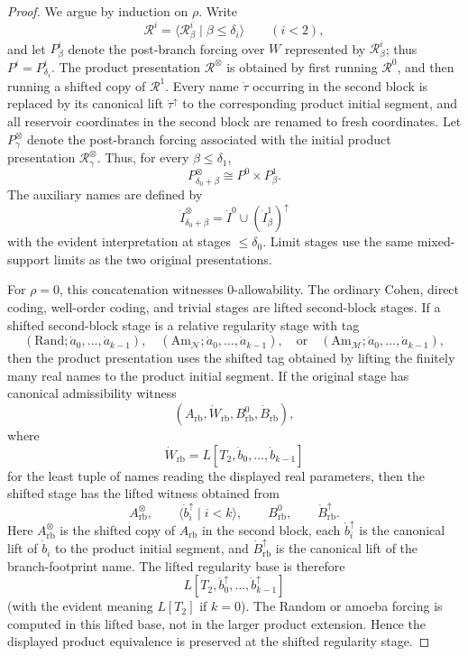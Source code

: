 \documentclass[10pt,a4paper]{amsart}
\begin{document}
\begin{proof}
We argue by induction on \(\rho\).  Write
\[
   \mathcal R^i=\langle \mathcal R^i_\beta\mid \beta\leq\delta_i\rangle
   \qquad (i<2),
\]
and let \(P^i_\beta\) denote the post-branch forcing over \(W\) represented by
\(\mathcal R^i_\beta\); thus \(P^i=P^i_{\delta_i}\).  The product presentation
\(\mathcal R^\otimes\) is obtained by first running \(\mathcal R^0\), and then
running a shifted copy of \(\mathcal R^1\).  Every name \(\dot\tau\) occurring in the second block is
replaced by its canonical lift \(\dot\tau^\uparrow\) to the corresponding
product initial segment, and all reservoir coordinates in the second block are
renamed to fresh coordinates.  Let \(P^\otimes_\gamma\) denote the post-branch forcing associated with the
initial product presentation \(\mathcal R^\otimes_\gamma\).  Thus, for every
\(\beta\leq\delta_1\),
\[
   P^\otimes_{\delta_0+\beta}
   \cong
   P^0\times P^1_\beta .
\]
The auxiliary names are defined by
\[
   \dot I^\otimes_{\delta_0+\beta}
   =
   \dot I^0\cup(\dot I^1_\beta)^\uparrow
\]
with the evident interpretation at stages \(\leq\delta_0\).  Limit stages use
the same mixed-support limits as the two original presentations.

For \(\rho=0\), this concatenation witnesses \(0\)-allowability.  The ordinary
Cohen, direct coding, well-order coding, and trivial stages are lifted
second-block stages.  If a shifted second-block stage is a relative regularity
stage with tag
\[
   (\mathrm{Rand};\dot a_0,\ldots,\dot a_{k-1}),
   \quad
   (\mathrm{Am}_{\mathcal N};\dot a_0,\ldots,\dot a_{k-1}),
   \quad\text{or}\quad
   (\mathrm{Am}_{\mathcal M};\dot a_0,\ldots,\dot a_{k-1}),
\]
then the product presentation uses the shifted tag obtained by lifting the
finitely many real names to the product initial segment.  If the original stage
has canonical admissibility witness
\[
   (A_{\mathrm{rb}},\dot W_{\mathrm{rb}},B^0_{\mathrm{rb}},\dot B_{\mathrm{rb}}),
\]
where
\[
   \dot W_{\mathrm{rb}}=L[T_2,\dot b_0,\ldots,\dot b_{k-1}]
\]
for the least tuple of names reading the displayed real parameters, then the
shifted stage has the lifted witness obtained from
\[
   A_{\mathrm{rb}}^\otimes,
   \qquad
   \langle \dot b_i^\uparrow\mid i<k\rangle,
   \qquad
   B^0_{\mathrm{rb}},
   \qquad
   \dot B_{\mathrm{rb}}^\uparrow.
\]
Here \(A_{\mathrm{rb}}^\otimes\) is the shifted copy of
\(A_{\mathrm{rb}}\) in the second block, each \(\dot b_i^\uparrow\) is the
canonical lift of \(\dot b_i\) to the product initial segment, and
\(\dot B_{\mathrm{rb}}^\uparrow\) is the canonical lift of the branch-footprint
name.  The lifted regularity base is therefore
\[
   L[T_2,\dot b_0^\uparrow,\ldots,\dot b_{k-1}^\uparrow]
\]
(with the evident meaning \(L[T_2]\) if \(k=0\)).  The Random or amoeba forcing
is computed in this lifted base, not in the larger product extension.  Hence the
displayed product equivalence is preserved at the shifted regularity stage.


\end{proof}
\end{document}
